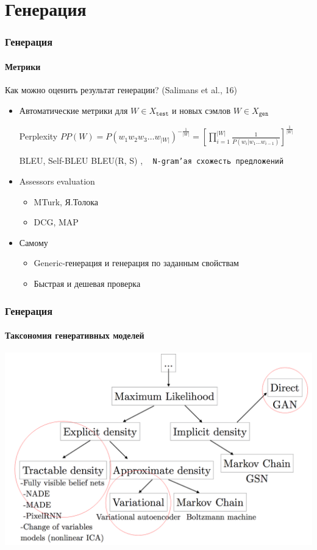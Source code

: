 \documentclass[10pt]{beamer}
\newcommand{\X}[1]{X_{\texttt{#1}}}
\newcommand{\Xtest}{\X{test}}
\newcommand{\Xgen}{\X{gen}}
\begin{document}
\section{Генерация}
\begin{frame}
\frametitle{Генерация}
\framesubtitle{Метрики}

Как можно оценить результат генерации? (Salimans et al., 16)
\begin{itemize}
    \item Автоматические метрики для $W \in \Xtest$ и новых сэмлов $W \in \Xgen$
    \begin{block}{Perplexity}
        $PP(W) = P(w_1w_2w_3\dots w_{|W|})^{-\frac{1}{|W|}} = \left[\prod\limits_{i=1}^{|W|}{\frac{1}{P(w_i|w_1\dots w_{i-1})}}\right]^{\frac{1}{|W|}}$
    \end{block}
    \begin{block}{BLEU, Self-BLEU}
        BLEU(R, S) \in [0, 1], ~ \texttt{N-gram'ая схожесть предложений}
    \end{block}
    \item Assessors evaluation
        \begin{itemize}
            \item MTurk, Я.Толока
            \item DCG, MAP
        \end{itemize}
    \item Самому
        \begin{itemize}
            \item Generic-генерация и генерация по заданным свойствам
            \item Быстрая и дешевая проверка
        \end{itemize}
\end{itemize}

\end{frame}
\begin{frame}
\frametitle{Генерация}
\framesubtitle{Таксономия генеративных моделей}

\includegraphics[width=\textwidth]{images/gen_taxonomy2.png}

\end{frame}
\end{document}
